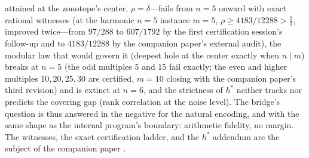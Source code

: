 \begin{enumerate}[leftmargin=1.7em,itemsep=4pt]
  attained at the zonotope's center, $\rho=\delta$---fails from $n=5$
  onward with exact rational witnesses (at the harmonic $n=5$ instance
  $m=5$, $\rho\ge 4183/12288>\tfrac13$, improved twice---from
  $97/288$ to $607/1792$ by the first certification session's
  follow-up and to $4183/12288$ by the companion paper's external
  audit), the modular law that would
  govern it (deepest hole at the center exactly when $n\mid m$) breaks
  at $n=5$ (the odd multiples $5$ and $15$ fail exactly; the even and
  higher multiples $10,20,25,30$ are certified, $m=10$ closing with
  the companion paper's third revision) and is extinct at $n=6$, and
  the strictness of $h^*$ neither
  tracks nor predicts the covering gap (rank correlation at the noise
  level). The bridge's question is thus answered in the negative for
  the natural encoding, and with the same shape as the internal
  program's boundary: arithmetic fidelity, no margin. The witnesses,
  the exact certification ladder, and the $h^*$ addendum are the
  subject of the companion paper \cite{companion-paper}.
\end{enumerate}
